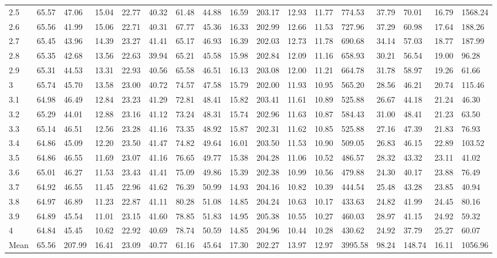 \begin{adjustbox}{angle=90}
\begin{center}
{\begin{tabular}{|l|llllllllllllllll|}
2.5&65.57&47.06&15.04&22.77&40.32&61.48&44.88&16.59&203.17&12.93&11.77&774.53&37.79&70.01&16.79&1568.24  \\ 
2.6&65.56&41.99&15.06&22.71&40.31&67.77&45.36&16.33&202.99&12.66&11.53&727.96&37.29&60.98&17.64&188.26  \\ 
2.7&65.45&43.96&14.39&23.27&41.41&65.17&46.93&16.39&202.03&12.73&11.78&690.68&34.14&57.03&18.77&187.99  \\ 
2.8&65.35&42.68&13.56&22.63&39.94&65.21&45.58&15.98&202.84&12.09&11.16&658.93&30.21&56.54&19.00&96.28  \\ 
2.9&65.31&44.53&13.31&22.93&40.56&65.58&46.51&16.13&203.08&12.00&11.21&664.78&31.78&58.97&19.26&61.66  \\ 
3&65.74&45.70&13.58&23.00&40.72&74.57&47.58&15.79&202.00&11.93&10.95&565.20&28.56&46.21&20.74&115.46  \\ 
3.1&64.98&46.49&12.84&23.23&41.29&72.81&48.41&15.82&203.41&11.61&10.89&525.88&26.67&44.18&21.24&46.30  \\ 
3.2&65.29&44.01&12.88&23.16&41.12&73.24&48.31&15.74&202.96&11.63&10.87&584.43&31.00&48.41&21.23&63.50  \\ 
3.3&65.14&46.51&12.56&23.28&41.16&73.35&48.92&15.87&202.31&11.62&10.85&525.88&27.16&47.39&21.83&76.93  \\ 
3.4&64.86&45.09&12.20&23.50&41.47&74.82&49.64&16.01&203.50&11.53&10.90&509.05&26.83&46.15&22.89&103.52  \\ 
3.5&64.86&46.55&11.69&23.07&41.16&76.65&49.77&15.38&204.28&11.06&10.52&486.57&28.32&43.32&23.11&41.02  \\ 
3.6&65.01&46.27&11.53&23.43&41.41&75.09&49.86&15.39&202.38&10.99&10.56&479.88&24.30&40.17&23.88&76.49  \\ 
3.7&64.92&46.55&11.45&22.96&41.62&76.39&50.99&14.93&204.16&10.82&10.39&444.54&25.48&43.28&23.85&40.94  \\ 
3.8&64.97&46.89&11.23&22.87&41.11&80.28&51.08&14.85&204.24&10.63&10.17&433.63&24.82&41.99&24.45&80.16  \\ 
3.9&64.89&45.54&11.01&23.15&41.60&78.85&51.83&14.95&205.38&10.55&10.27&460.03&28.97&41.15&24.92&59.32  \\ 
4&64.84&45.45&10.62&22.92&40.69&78.74&50.59&14.85&204.96&10.44&10.28&430.62&24.92&37.79&25.27&60.07  \\ \hline \hline
Mean&65.56&207.99&16.41&23.09&40.77&61.16&45.64&17.30&202.27&13.97&12.97&3995.58&98.24&148.74&16.11&1056.96  \\ \hline
\end{tabular}
    }
\end{center}
\end{adjustbox}






